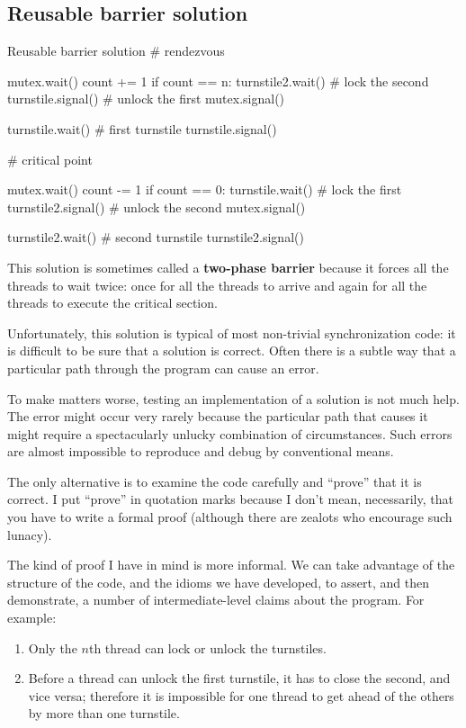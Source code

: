 \subsection*{Reusable barrier solution}

\begin{lstbox}{Reusable barrier solution}
# rendezvous

mutex.wait()
    count += 1
    if count == n:
        turnstile2.wait()       # lock the second
        turnstile.signal()      # unlock the first
mutex.signal()

turnstile.wait()                # first turnstile
turnstile.signal()

# critical point

mutex.wait()
    count -= 1
    if count == 0: 
        turnstile.wait()         # lock the first
        turnstile2.signal()      # unlock the second
mutex.signal()

turnstile2.wait()                # second turnstile
turnstile2.signal()
\end{lstbox}

This solution is sometimes called a {\bf two-phase barrier} because
it forces all the threads to wait twice: once for all the threads
to arrive and again for all the threads to execute the critical
section.

Unfortunately, this solution is typical of most non-trivial
synchronization code: it is difficult to be sure that a solution is
correct.  Often there is a subtle way that a particular path through
the program can cause an error.

To make matters worse, testing an implementation of a solution
is not much help.  The error might occur very rarely
because the particular path that causes it might
require a spectacularly unlucky combination of circumstances.
Such errors are almost
impossible to reproduce and debug by conventional means.

The only alternative is to examine the code carefully and
``prove'' that it is correct.  I put ``prove'' in quotation
marks because I don't mean, necessarily, that you have to write
a formal proof (although there are zealots who encourage
such lunacy).

The kind of proof I have in mind is more informal.  We can take
advantage of the structure of the code, and the idioms we have
developed, to assert, and then demonstrate, a number of
intermediate-level claims about the program.  For example: \begin{enumerate} 
\item Only the $n$th thread can lock or unlock the turnstiles.

\item Before a thread can unlock the first turnstile, it has to close 
the second, and vice versa; therefore it is impossible for one thread
to get ahead of the others by more than one turnstile.

\end{enumerate}

